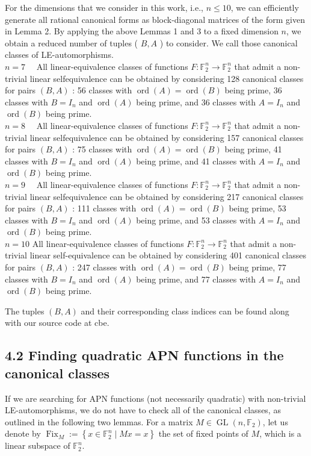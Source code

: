 \documentclass[10pt]{article}
\begin{document}
For the dimensions that we consider in this work, i.e., $n \leq 10$, we can efficiently generate all rational canonical forms as block-diagonal matrices of the form given in Lemma 2. By applying the above Lemmas 1 and 3 to a fixed dimension $n$, we obtain a reduced number of tuples ( $B, A$ ) to consider. We call those canonical classes of LE-automorphisms.\\
$n=7 \quad$ All linear-equivalence classes of functions $F: \mathbb{F}_{2}^{n} \rightarrow \mathbb{F}_{2}^{n}$ that admit a non-trivial linear selfequivalence can be obtained by considering 128 canonical classes for pairs $(B, A)$ : 56 classes with $\operatorname{ord}(A)=\operatorname{ord}(B)$ being prime, 36 classes with $B=I_{n}$ and $\operatorname{ord}(A)$ being prime, and 36 classes with $A=I_{n}$ and $\operatorname{ord}(B)$ being prime.\\
$n=8 \quad$ All linear-equivalence classes of functions $F: \mathbb{F}_{2}^{n} \rightarrow \mathbb{F}_{2}^{n}$ that admit a non-trivial linear selfequivalence can be obtained by considering 157 canonical classes for pairs $(B, A)$ : 75 classes with $\operatorname{ord}(A)=\operatorname{ord}(B)$ being prime, 41 classes with $B=I_{n}$ and $\operatorname{ord}(A)$ being prime, and 41 classes with $A=I_{n}$ and $\operatorname{ord}(B)$ being prime.\\
$n=9 \quad$ All linear-equivalence classes of functions $F: \mathbb{F}_{2}^{n} \rightarrow \mathbb{F}_{2}^{n}$ that admit a non-trivial linear selfequivalence can be obtained by considering 217 canonical classes for pairs $(B, A)$ : 111 classes with $\operatorname{ord}(A)=\operatorname{ord}(B)$ being prime, 53 classes with $B=I_{n}$ and $\operatorname{ord}(A)$ being prime, and 53 classes with $A=I_{n}$ and $\operatorname{ord}(B)$ being prime.\\
$n=10$ All linear-equivalence classes of functions $F: \mathbb{F}_{2}^{n} \rightarrow \mathbb{F}_{2}^{n}$ that admit a non-trivial linear self-equivalence can be obtained by considering 401 canonical classes for pairs $(B, A)$ : 247 classes with $\operatorname{ord}(A)=\operatorname{ord}(B)$ being prime, 77 classes with $B=I_{n}$ and $\operatorname{ord}(A)$ being prime, and 77 classes with $A=I_{n}$ and $\operatorname{ord}(B)$ being prime.

The tuples $(B, A)$ and their corresponding class indices can be found along with our source code at cbe.

\subsection*{4.2 Finding quadratic APN functions in the canonical classes}
If we are searching for APN functions (not necessarily quadratic) with non-trivial LE-automorphisms, we do not have to check all of the canonical classes, as outlined in the following two lemmas. For a matrix $M \in \operatorname{GL}\left(n, \mathbb{F}_{2}\right)$, let us denote by $\operatorname{Fix}_{M}:=\left\{x \in \mathbb{F}_{2}^{n} \mid M x=x\right\}$ the set of fixed points of $M$, which is a linear subspace of $\mathbb{F}_{2}^{n}$.
\end{document}
